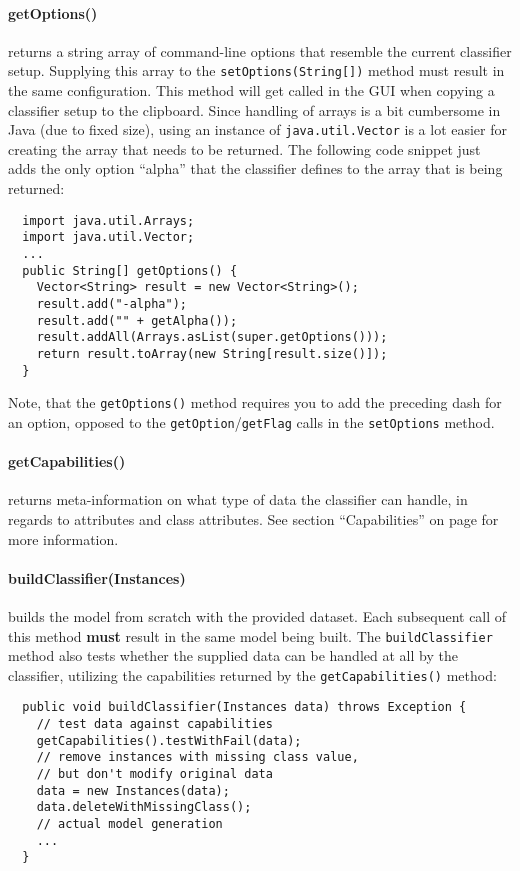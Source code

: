 \paragraph{getOptions()} returns a string array of command-line options that
resemble the current classifier setup. Supplying this array to the
\texttt{setOptions(String[])} method must result in the same configuration.
This method will get called in the GUI when copying a classifier setup to the
clipboard. Since handling of arrays is a bit cumbersome in Java (due to fixed
size), using an instance of \texttt{java.util.Vector} is a lot easier for
creating the array that needs to be returned. The following code snippet just
adds the only option ``alpha'' that the classifier defines to the array that is
being returned:
\begin{verbatim}
  import java.util.Arrays;
  import java.util.Vector;
  ...
  public String[] getOptions() {
    Vector<String> result = new Vector<String>();
    result.add("-alpha");
    result.add("" + getAlpha());
    result.addAll(Arrays.asList(super.getOptions()));
    return result.toArray(new String[result.size()]);
  }
\end{verbatim}
Note, that the \texttt{getOptions()} method requires you to add the preceding
dash for an option, opposed to the \texttt{getOption}/\texttt{getFlag} calls in
the \texttt{setOptions} method.

\newpage
\paragraph{getCapabilities()} returns meta-information on what type of data the
classifier can handle, in regards to attributes and class attributes. See
section ``Capabilities'' on page \pageref{classifier_capabilities} for more
information.

\paragraph{buildClassifier(Instances)} builds the model from scratch with the
provided dataset. Each subsequent call of this method \textbf{must} result in
the same model being built. The \texttt{buildClassifier} method also tests
whether the supplied data can be handled at all by the classifier, utilizing
the capabilities returned by the \texttt{getCapabilities()} method:
\begin{verbatim}
  public void buildClassifier(Instances data) throws Exception {
    // test data against capabilities
    getCapabilities().testWithFail(data);
    // remove instances with missing class value,
    // but don't modify original data
    data = new Instances(data);
    data.deleteWithMissingClass();
    // actual model generation
    ...
  }
\end{verbatim}

